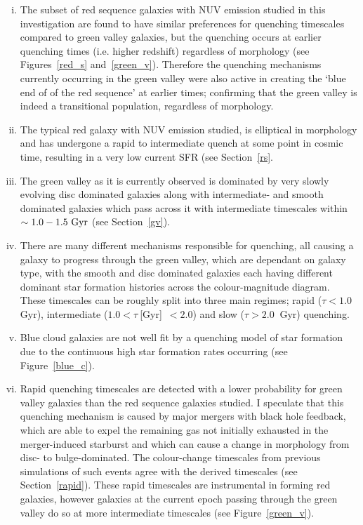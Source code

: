 \begin{enumerate}[(i)]
\item The subset of red sequence galaxies with NUV emission studied in this investigation are found to have similar preferences for quenching timescales compared to green valley galaxies, but the quenching occurs at earlier quenching times (i.e. higher redshift) regardless of morphology (see Figures~\ref{red_s} and~\ref{green_v}). Therefore the quenching mechanisms currently occurring in the green valley were also active in creating the `blue end of of the red sequence' at earlier times; confirming that the green valley is indeed a transitional population, regardless of morphology.

\item The typical red galaxy with NUV emission studied, is elliptical in morphology and has undergone a rapid to intermediate quench at some point in cosmic time, resulting in a very low current SFR (see Section~\ref{rs}.

\item The green valley as it is currently observed is dominated by very slowly evolving disc dominated galaxies along with intermediate- and smooth dominated galaxies which pass across it with intermediate timescales within $\sim 1.0-1.5~\rm{Gyr}$ (see Section~\ref{gv}).

\item There are many different mechanisms responsible for quenching, all causing a galaxy to progress through the green valley, which are dependant on galaxy type, with the smooth and disc dominated galaxies each having different dominant star formation histories across the colour-magnitude diagram. These timescales can be roughly split into three main regimes; rapid ($\tau < 1.0~$Gyr), intermediate ($1.0 < \tau~$[Gyr]~$< 2.0$) and slow ($\tau > 2.0~$ Gyr) quenching.

\item Blue cloud galaxies are not well fit by a quenching model of star formation due to the continuous high star formation rates occurring (see Figure~\ref{blue_c}).

\item Rapid quenching timescales are detected with a lower probability for green valley galaxies than the red sequence galaxies studied. I speculate that this quenching mechanism is caused by major mergers with black hole feedback, which are able to expel the remaining gas not initially exhausted in the merger-induced starburst and which can cause a change in morphology from disc- to bulge-dominated. The colour-change timescales from previous simulations of such events agree with the derived timescales (see Section~\ref{rapid}). These rapid timescales are instrumental in forming red galaxies, however galaxies at the current epoch passing through the green valley do so at more intermediate timescales (see Figure~\ref{green_v}).


\end{enumerate}
